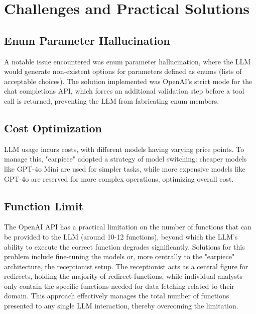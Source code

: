 \documentclass{article}
\begin{document}
\section{Challenges and Practical Solutions}
\subsection{Enum Parameter Hallucination}
A notable issue encountered was enum parameter hallucination, where the LLM would generate non-existent options for parameters defined as enums (lists of acceptable choices). The solution implemented was OpenAI's strict mode for the chat completions API, which forces an additional validation step before a tool call is returned, preventing the LLM from fabricating enum members.

\subsection{Cost Optimization}
LLM usage incurs costs, with different models having varying price points. To manage this, "earpiece" adopted a strategy of model switching: cheaper models like GPT-4o Mini are used for simpler tasks, while more expensive models like GPT-4o are reserved for more complex operations, optimizing overall cost.

\subsection{Function Limit}
The OpenAI API has a practical limitation on the number of functions that can be provided to the LLM (around 10-12 functions), beyond which the LLM's ability to execute the correct function degrades significantly. Solutions for this problem include fine-tuning the models or, more centrally to the "earpiece" architecture, the receptionist setup. The receptionist acts as a central figure for redirects, holding the majority of redirect functions, while individual analysts only contain the specific functions needed for data fetching related to their domain. This approach effectively manages the total number of functions presented to any single LLM interaction, thereby overcoming the limitation.
\end{document}
